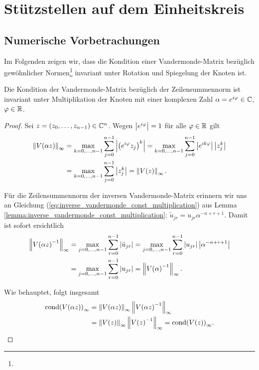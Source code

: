 \chapter{Stützstellen auf dem Einheitskreis}
\section{Numerische Vorbetrachungen}

Im Folgenden zeigen wir, dass die Kondition einer Vandermonde-Matrix bezüglich
gewöhnlicher Normen\footnote{}%
invariant unter Rotation und Spiegelung der Knoten ist.


\begin{lemma}
    Die Kondition der Vandermonde-Matrix bezüglich der Zeilensummennorm ist
    invariant unter Multiplikation der Knoten mit einer komplexen Zahl
    $\alpha = e^{i\varphi} \in \mathbb{C}$, $\varphi \in \mathbb{R}$.
\end{lemma}

\begin{proof}
    Sei $z = (z_0, \dots, z_{n-1}) \in \mathbb{C}^n$.
    Wegen $\left\lvert e^{i\varphi} \right\rvert = 1$ für alle $\varphi \in \mathbb{R}$ gilt
    \[
        \begin{split}
            \left\lVert \text{$V(\alpha z)$} \right\rVert_\infty
            &= \max_{k=0, \dots, n-1} \sum_{j=0}^{n-1} \left\lvert \left(e^{i\varphi} z_j\right)^k \right\rvert
            = \max_{k=0, \dots, n-1} \sum_{j=0}^{n-1} \left\lvert e^{ik\varphi} \right\rvert \left\lvert z_j^k \right\rvert\\
            &= \max_{k=0, \dots, n-1} \sum_{j=0}^{n-1} \left\lvert z_j^k \right\rvert
            = \left\lVert \text{$V(z)$} \right\rVert_\infty.
        \end{split}
    \]

    \noindent Für die Zeilensummennorm der inversen Vandermonde-Matrix erinnern wir uns an Gleichung
    (\ref{eq:inverse_vandermonde_const_multiplication})
    aus Lemma \ref{lemma:inverse_vandermonde_const_multiplication}:
    $\tilde{u}_{jr} = u_{jr} \alpha^{-n+r+1}$.
    Damit ist sofort ersichtlich
    \[
        \begin{split}
            \left\lVert \text{$V(\alpha z)$}^{-1} \right\rVert_\infty
            &= \max_{j=0, \dots, n-1} \sum_{r=0}^{n-1} \left\lvert \tilde{u}_{jr} \right\rvert
            = \max_{j=0, \dots, n-1} \sum_{r=0}^{n-1} \left\lvert u_{jr} \right\rvert \left\lvert \alpha^{-n+r+1} \right\rvert\\
            &= \max_{j=0, \dots, n-1} \sum_{r=0}^{n-1} \left\lvert u_{jr} \right\rvert
            = \left\lVert \text{$V(\alpha)$}^{-1} \right\rVert_\infty.
        \end{split}
    \]

    \noindent Wie behauptet, folgt insgesamt
    \[
        \begin{split}
            \text{cond$ \left( \text{$V(\alpha z)$} \right)$}_\infty
            &= \left\lVert \text{$V(\alpha z)$} \right\rVert_\infty \left\lVert \text{$V(\alpha z)$}^{-1} \right\rVert_\infty\\
            &= \left\lVert \text{$V(z)$} \right\rVert_\infty \left\lVert \text{$V(z)$}^{-1} \right\rVert_\infty
            = \text{cond$ \left( \text{$V(z)$} \right)$}_\infty.
        \end{split}
    \]

\end{proof}

